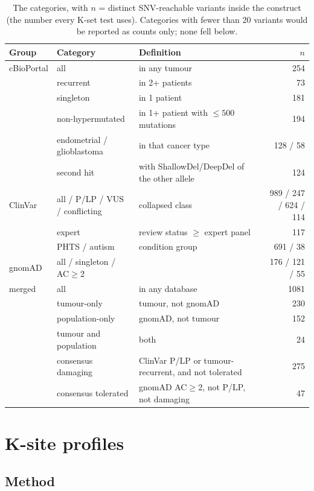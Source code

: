 \documentclass[11pt,a4paper]{article}
\begin{document}
\begin{table}[H]
\centering\small
\begin{tabular}{@{}llR{5.0cm}r@{}}
\toprule
Group & Category & Definition & $n$ \\
\midrule
cBioPortal & all & in any tumour & 254 \\
 & recurrent & in 2+ patients & 73 \\
 & singleton & in 1 patient & 181 \\
 & non-hypermutated & in 1+ patient with $\le 500$ mutations & 194 \\
 & endometrial / glioblastoma & in that cancer type & 128 / 58 \\
 & second hit & with ShallowDel/DeepDel of the other allele & 124 \\
ClinVar & all / P/LP / VUS / conflicting & collapsed class & 989 / 247 / 624 / 114 \\
 & expert & review status $\ge$ expert panel & 117 \\
 & PHTS / autism & condition group & 691 / 38 \\
gnomAD & all / singleton / AC$\ge$2 & & 176 / 121 / 55 \\
merged & all & in any database & 1081 \\
 & tumour-only & tumour, not gnomAD & 230 \\
 & population-only & gnomAD, not tumour & 152 \\
 & tumour and population & both & 24 \\
 & consensus damaging & ClinVar P/LP or tumour-recurrent, and not tolerated & 275 \\
 & consensus tolerated & gnomAD AC$\ge$2, not P/LP, not damaging & 47 \\
\bottomrule
\end{tabular}
\caption{The categories, with $n$ = distinct SNV-reachable variants inside the
construct (the number every K-set test uses). Categories with fewer than 20
variants would be reported as counts only; none fell below.}
\label{tab:cats}
\end{table}

\section{K-site profiles}

\subsection{Method}
\end{document}
